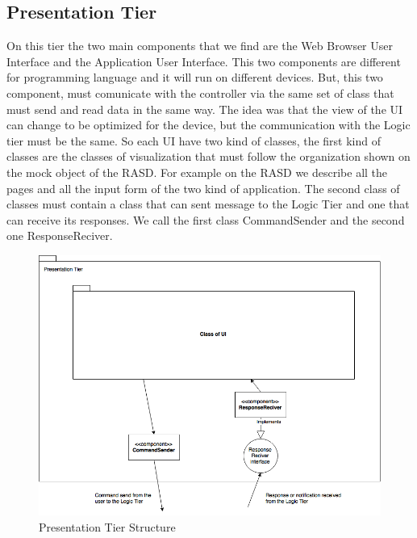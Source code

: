 \documentclass[../../../../../../dd.tex]{subfiles}
\begin{document}
	\subsection{Presentation Tier}
		On this tier the two main components that we find are the Web Browser User Interface and the Application User Interface. This two components are different for programming language and it will run on different devices. But, this two component, must comunicate with the controller via the same set of class that must send and read data in the same way. The idea was that the view of the UI can change to be optimized for the device, but the communication with the Logic tier must be the same. So each UI have two kind of classes, the first kind of classes are the classes of visualization that must follow the organization shown on the mock object of the RASD. For example on the RASD we describe all the pages and all the input form of the two kind of application. The second class of classes must contain a class that can sent message to the Logic Tier and one that can receive its responses. We call the first class CommandSender and the second one ResponseReciver.

		\begin{figure}[H]
				\centering
				\includegraphics[width=\textwidth, scale=0.5]{../images/PresentationTier.png}
			\caption{Presentation Tier Structure}\label{fig:PresTier}
		\end{figure}
	
\end{document}

